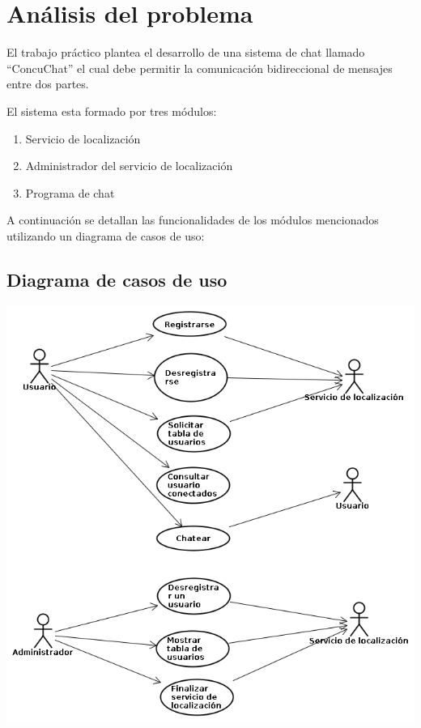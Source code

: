 \section{Análisis del problema}

El trabajo práctico plantea el desarrollo de una sistema de chat llamado ``ConcuChat'' el cual debe permitir la
comunicación bidireccional de mensajes entre dos partes. 

El sistema esta formado por tres módulos:

\begin{enumerate}
  \item Servicio de localización
  \item Administrador del servicio de localización
  \item Programa de chat
\end{enumerate}

A continuación se detallan las funcionalidades de los módulos mencionados utilizando un diagrama de casos de uso:

\subsection{Diagrama de casos de uso}
\begin{center}
\small\includegraphics[scale=0.55]{./Images/CasosDeUso}
\end{center}